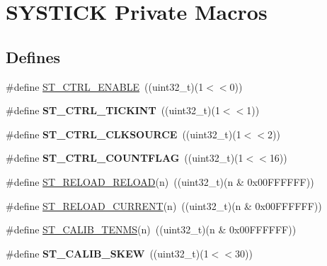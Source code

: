 \hypertarget{group___s_y_s_t_i_c_k___private___macros}{\section{\-S\-Y\-S\-T\-I\-C\-K \-Private \-Macros}
\label{group___s_y_s_t_i_c_k___private___macros}
}
\subsection*{\-Defines}
\begin{DoxyCompactItemize}
\item 
\#define \hyperlink{group___s_y_s_t_i_c_k___private___macros_ga0a2f91ae597c59a48def2f016250658d}{\-S\-T\-\_\-\-C\-T\-R\-L\-\_\-\-E\-N\-A\-B\-L\-E}~((uint32\-\_\-t)(1$<$$<$0))
\item 
\hypertarget{group___s_y_s_t_i_c_k___private___macros_ga7045575c13cce8d93982307913fa9d69}{\#define {\bfseries \-S\-T\-\_\-\-C\-T\-R\-L\-\_\-\-T\-I\-C\-K\-I\-N\-T}~((uint32\-\_\-t)(1$<$$<$1))}\label{group___s_y_s_t_i_c_k___private___macros_ga7045575c13cce8d93982307913fa9d69}

\item 
\hypertarget{group___s_y_s_t_i_c_k___private___macros_gaea566db51f32062506221a46219123c4}{\#define {\bfseries \-S\-T\-\_\-\-C\-T\-R\-L\-\_\-\-C\-L\-K\-S\-O\-U\-R\-C\-E}~((uint32\-\_\-t)(1$<$$<$2))}\label{group___s_y_s_t_i_c_k___private___macros_gaea566db51f32062506221a46219123c4}

\item 
\hypertarget{group___s_y_s_t_i_c_k___private___macros_ga5808c01b64941a9cafff79660b269edb}{\#define {\bfseries \-S\-T\-\_\-\-C\-T\-R\-L\-\_\-\-C\-O\-U\-N\-T\-F\-L\-A\-G}~((uint32\-\_\-t)(1$<$$<$16))}\label{group___s_y_s_t_i_c_k___private___macros_ga5808c01b64941a9cafff79660b269edb}

\item 
\#define \hyperlink{group___s_y_s_t_i_c_k___private___macros_ga3706201001445f401a6af5a72b8f7459}{\-S\-T\-\_\-\-R\-E\-L\-O\-A\-D\-\_\-\-R\-E\-L\-O\-A\-D}(n)~((uint32\-\_\-t)(n \& 0x00\-F\-F\-F\-F\-F\-F))
\item 
\#define \hyperlink{group___s_y_s_t_i_c_k___private___macros_ga74c13eb0a81c99959252758baa440105}{\-S\-T\-\_\-\-R\-E\-L\-O\-A\-D\-\_\-\-C\-U\-R\-R\-E\-N\-T}(n)~((uint32\-\_\-t)(n \& 0x00\-F\-F\-F\-F\-F\-F))
\item 
\#define \hyperlink{group___s_y_s_t_i_c_k___private___macros_gaf2ef16e76fc10f9df5e136eaac6790e8}{\-S\-T\-\_\-\-C\-A\-L\-I\-B\-\_\-\-T\-E\-N\-M\-S}(n)~((uint32\-\_\-t)(n \& 0x00\-F\-F\-F\-F\-F\-F))
\item 
\hypertarget{group___s_y_s_t_i_c_k___private___macros_ga5035fe14cf0fdeeabd8293b373e0b253}{\#define {\bfseries \-S\-T\-\_\-\-C\-A\-L\-I\-B\-\_\-\-S\-K\-E\-W}~((uint32\-\_\-t)(1$<$$<$30))}\label{group___s_y_s_t_i_c_k___private___macros_ga5035fe14cf0fdeeabd8293b373e0b253}


\end{DoxyCompactItemize}
